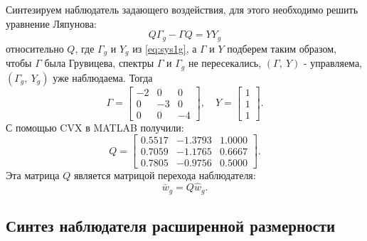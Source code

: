 Синтезируем наблюдатель задающего воздействия, для этого необходимо решить
уравнение Ляпунова:
\begin{equation}
    \label{eq:lyap1}
    Q\Gamma_g-\Gamma Q=YY_g
\end{equation}
относительно $Q$, где $\Gamma_g$ и $Y_g$ из \eqref{eq:sys1g}, а
$\Gamma$ и $Y$ подберем таким образом, чтобы $\Gamma$ была Грувицева,
спектры $\Gamma$ и $\Gamma_g$ не пересекались, $(\Gamma,\ Y)$ - управляема, $(\Gamma_g,\ Y_g)$ уже наблюдаема. 
Тогда
\begin{equation*}
    \Gamma=\begin{bmatrix}
        -2 & 0 & 0 \\
        0 & -3 & 0 \\
        0 & 0 & -4
    \end{bmatrix},\quad
    Y=\begin{bmatrix}
        1 \\ 1 \\ 1
    \end{bmatrix}.
\end{equation*}
С помощью CVX в MATLAB получили:
\begin{equation*}
    Q=\begin{bmatrix}
        0.5517&	-1.3793&	1.0000\\
        0.7059&	-1.1765&	0.6667\\
        0.7805&	-0.9756&	0.5000
    \end{bmatrix}.
\end{equation*}
Эта матрица $Q$ является матрицой перехода наблюдателя:
\begin{equation*}
    \bar w_g=Q\hat w_g.
\end{equation*}

\subsection{Синтез наблюдателя расширенной размерности}

